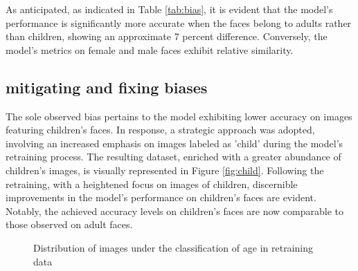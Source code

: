 \documentclass[]{report}
\begin{document}
As anticipated, as indicated in Table \ref{tab:bias}, it is evident that the model's performance is significantly more accurate when the faces belong to adults rather than children, showing an approximate 7 percent difference. Conversely, the model's metrics on female and male faces exhibit relative similarity.

\subsection{mitigating and fixing biases}


The sole observed bias pertains to the model exhibiting lower accuracy on images featuring children's faces. In response, a strategic approach was adopted, involving an increased emphasis on images labeled as 'child' during the model's retraining process. The resulting dataset, enriched with a greater abundance of children's images, is visually represented in Figure \ref{fig:child}. Following the retraining, with a heightened focus on images of children, discernible improvements in the model's performance on children's faces are evident. Notably, the achieved accuracy levels on children's faces are now comparable to those observed on adult faces.



\begin{figure}
	
	\caption{Distribution of images under the classification of age in retraining data}
\end{figure}
\end{document}
